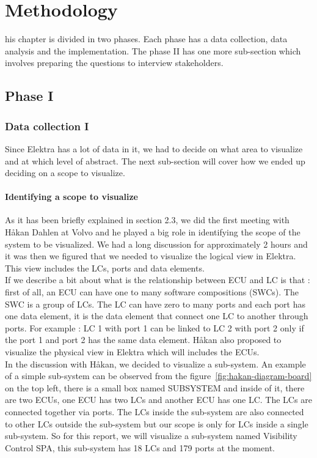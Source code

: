 \chapter{Methodology}
\label{methodology}
\lettrine[findent=2pt]{}{ }his chapter is divided in two phases. Each phase has a data collection, data analysis and the implementation. The  phase II has one more sub-section which involves preparing the questions to interview stakeholders.

\section{Phase I}

\subsection{Data collection I}
Since Elektra has a lot of data in it, we had to decide on what area to visualize and at which level of abstract. The next sub-section will cover how we ended up deciding on a scope to visualize.

\subsubsection{Identifying a scope to visualize}
As it has been briefly explained in section 2.3, we did the first meeting with Håkan Dahlen at Volvo and he played a big role in identifying the scope of the system to be visualized. We had a long discussion for approximately 2 hours and it was then we figured that we needed to visualize the logical view in Elektra. This view includes the LCs, ports and data elements. \\

If we describe a bit about what is the relationship between ECU and LC is that : first of all, an ECU can have one to many software compositions (SWCs). The SWC is a group of LCs. The LC can have zero to many ports and each port has one data element, it is the data element that connect one LC to another through ports. For example : LC 1 with port 1 can be linked to LC 2 with port 2 only if the port 1 and port 2 has the same data element. Håkan also proposed to visualize the physical view in Elektra which will includes the ECUs.\\

In the discussion with Håkan, we decided to visualize a sub-system. An example of a simple sub-system can be observed from the figure~\ref{fig:hakan-diagram-board} on the top left, there is a small box named SUBSYSTEM and inside of it, there are two ECUs, one ECU has two LCs and another ECU has one LC. The LCs are connected together via ports. The LCs inside the sub-system are also connected to other LCs outside the sub-system but our scope is only for LCs inside a single sub-system. So for this report, we will visualize a sub-system named Visibility Control SPA, this sub-system has 18 LCs and 179 ports at the moment.\\


